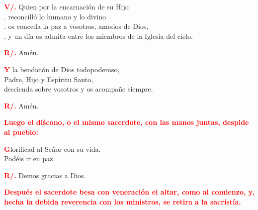 \documentclass[12pt, letterpaper]{report}
\begin{document}
\Large \hspace{-0.9cm} {\bfseries \textcolor{red}{V/.}} \hspace{0.5cm} Quien por la encarnaci\'on de su Hijo \\
. \hspace{1cm} reconcill\'o lo humano y lo divino \\
. \hspace{1cm} os conceda la paz a vosotros, amados de Dios, \\
. \hspace{1cm} y un d\'ia os admita entre los miembros de la Iglesia del cielo. \newline

\Large \hspace{-0.9cm} {\bfseries \textcolor{red}{R/.}} \hspace{0.5cm} Am\'en. \newline

\newpage

\lettrine[lines=1]{\bfseries \textcolor{red}{Y}}{} \Large la bendici\'on de Dios todopoderoso, \\
Padre, Hijo \Huge{\textcolor{red}{}} \Large y Esp\'iritu Santo, \\
descienda sobre vosotros y os acompa\~ne siempre. \newline

\Large \hspace{-0.9cm} {\bfseries \textcolor{red}{R/.}} \hspace{0.5cm} Am\'en.\newline

\large{\bfseries \textcolor{red}{Luego el di\'scono, o el mismo sacerdote, con las manos juntas, despide al pueblo:}}\newline

\lettrine[lines=1]{\bfseries \textcolor{red}{G}}{}\Large lorificad al Se\~nor con su vida. \\
Pod\'eis ir en paz. \newline

\Large \hspace{-0.9cm} {\bfseries \textcolor{red}{R/.}} \hspace{0.5cm} Demos gracias a Dios. \newline

\large{\bfseries \textcolor{red}{Despu\'es el sacerdote besa con veneraci\'on el altar, como al comienzo, y, hecha la debida reverencia con los ministros, se retira a la sacrist\'ia.}}\newline

\end{document}
